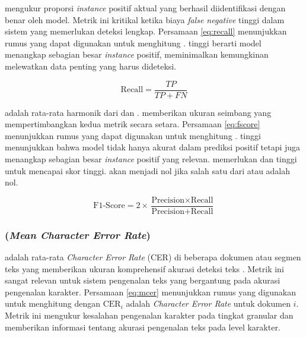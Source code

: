 \recallfl{} mengukur proporsi \emph{instance} positif aktual yang berhasil diidentifikasi dengan benar oleh model. Metrik ini kritikal ketika biaya \emph{false negative} tinggi dalam sistem yang memerlukan deteksi lengkap. Persamaan \eqref{eq:recall} menunjukkan rumus yang dapat digunakan untuk menghitung \recall{} \parencite{jayaswal2020evalmetrics}.\recallfl{} tinggi berarti model menangkap sebagian besar \emph{instance} positif, meminimalkan kemungkinan melewatkan data penting yang harus dideteksi.

\begin{equation}
    \label{eq:recall}
\text{Recall} = \frac{TP}{TP + FN}
\end{equation}

\fscore{} adalah rata-rata harmonik dari \precision{} dan \recall{}. \fscore{} memberikan ukuran seimbang yang mempertimbangkan kedua metrik secara setara. Persamaan \eqref{eq:fscore} menunjukkan rumus yang dapat digunakan untuk menghitung \fscore{} \parencite{jayaswal2020evalmetrics}. \fscore{} tinggi menunjukkan bahwa model tidak hanya akurat dalam prediksi positif tetapi juga menangkap sebagian besar \emph{instance} positif yang relevan. \fscore{} memerlukan \precision{} dan \recall{} tinggi untuk mencapai skor tinggi. \fscore{} akan menjadi nol jika salah satu dari \precision{} atau \recall{} adalah nol.

\begin{equation}
    \label{eq:fscore}
\text{F1-Score} = 2 \times \frac{\text{Precision} \times \text{Recall}}{\text{Precision} + \text{Recall}}
\end{equation}

% 

\subsubsection{\mcer{} (\emph{Mean Character Error Rate})}

\mcer{} adalah rata-rata \emph{Character Error Rate} (CER) di beberapa dokumen atau segmen teks yang memberikan ukuran komprehensif akurasi deteksi teks \parencite{holley2009ocr}. Metrik ini sangat relevan untuk sistem pengenalan teks yang bergantung pada akurasi pengenalan karakter. Persamaan \eqref{eq:mcer} menunjukkan rumus yang digunakan untuk menghitung \mcer dengan $\text{CER}_i$ adalah \emph{Character Error Rate} untuk dokumen $i$. Metrik ini mengukur kesalahan pengenalan karakter pada tingkat granular dan memberikan informasi tentang akurasi pengenalan teks pada level karakter.

